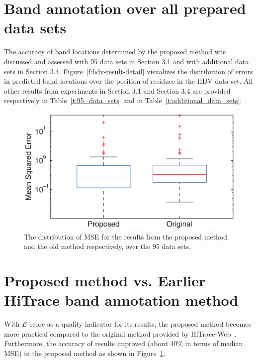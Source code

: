 \documentclass[letter]{bioinfo}
\newcommand{\escore}{{\emph{E}}}
\begin{document}
\section{ Band annotation over all prepared data sets }
The accuracy of band locations determined by the proposed method was discussed and assessed with 95 data sets in Section 3.1 and with additional data sets in Section 3.4. Figure~\ref{f:hdv-result-detail} visualizes the distribution of errors in predicted band locations over the position of residues in the HDV data set.
All other results from experiments in Section 3.1 and Section 3.4 are provided respectively in Table~\ref{t:95_data_sets} and in Table~\ref{t:additional_data_sets}.





\begin{figure}
\centering
\includegraphics[width=\linewidth]{figures/supp_old_new_comparison}
\caption{The distribution of MSE for the results from the proposed method and the old method respectively, over the 95 data sets.}
\label{f:old_vs_new}
\end{figure}


\section{ Proposed method vs. Earlier HiTrace band annotation method }
With $\escore$-score as a quality indicator for its results, the proposed method becomes more practical compared to the original method provided by HiTrace-Web~\citep{Kim2013}. Furthermore, the accuracy of results improved (about 40\% in terms of median MSE) in the proposed method as shown in Figure~\ref{f:old_vs_new}.
\end{document}
